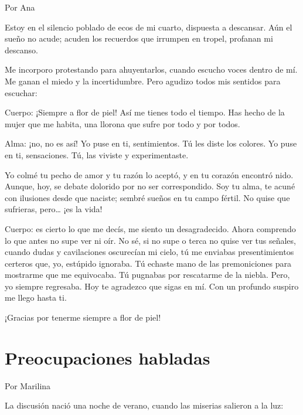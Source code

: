 \documentclass[11pt,twoside,openright,a5paper]{book}
\begin{document}
                                                                                        \begin{flushright}Por Ana\end{flushright}


Estoy en el silencio poblado de ecos de mi cuarto, dispuesta a descansar. Aún el sueño no acude; acuden los recuerdos que irrumpen en tropel, profanan mi descanso.

Me incorporo protestando para ahuyentarlos, cuando escucho voces dentro de mí. Me ganan el miedo y la incertidumbre. Pero agudizo todos mis sentidos para escuchar:

Cuerpo: ¡Siempre a flor de piel! Así me tienes todo el tiempo. Has hecho de la mujer que me habita, una llorona que sufre por todo y por todos.

Alma: ¡no, no  es así! Yo puse en ti, sentimientos. Tú les diste los colores. Yo puse en ti, sensaciones. Tú, las viviste y experimentaste.

Yo colmé tu pecho de amor y tu razón lo aceptó, y en tu corazón encontró nido. Aunque, hoy, se debate dolorido por no ser correspondido. Soy tu alma, te acuné con ilusiones desde que naciste; sembré sueños en tu campo fértil. No quise que sufrieras, pero… ¡es la vida!

Cuerpo: es cierto lo que me decís, me siento un desagradecido. Ahora comprendo lo que antes no supe ver ni oír. No sé, si no supe o terca no quise ver tus señales, cuando dudas y cavilaciones oscurecían mi cielo, tú me enviabas presentimientos certeros que, yo, estúpido ignoraba. Tú echaste mano de las premoniciones para mostrarme que me equivocaba. Tú pugnabas por rescatarme de la niebla. Pero, yo siempre regresaba. Hoy te agradezco que sigas en mí. Con un profundo suspiro me llego hasta ti. 

¡Gracias por tenerme siempre a flor de piel!

\section*{Preocupaciones habladas}

                                                                                        \begin{flushright}Por Marilina\end{flushright}


La discusión nació una noche de verano, cuando las miserias salieron a la luz:
\end{document}
